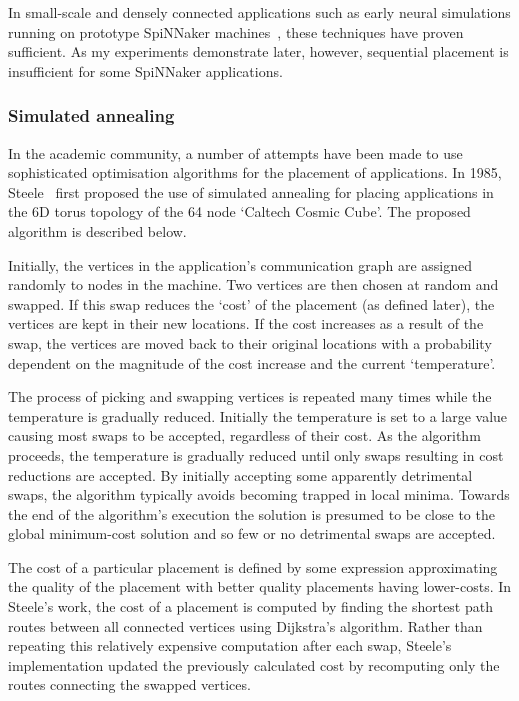 				In small-scale and densely connected applications such as early neural
				simulations running on prototype SpiNNaker machines~\cite{galluppi10},
				these techniques have proven sufficient.  As my experiments demonstrate
				later, however, sequential placement is insufficient for some SpiNNaker
				applications.
				
			\subsubsection{Simulated annealing}
				
				\label{sec:application-placement-summary}
				
				In the academic community, a number of attempts have been made to use
				sophisticated optimisation algorithms for the placement of
				applications. In 1985, Steele~\cite{steele85} first proposed the use of
				simulated annealing for placing applications in the 6D torus topology
				of the 64 node `Caltech Cosmic Cube'. The proposed algorithm is
				described below.
				
				Initially, the vertices in the application's communication graph are
				assigned randomly to nodes in the machine. Two vertices are then chosen
				at random and swapped.  If this swap reduces the `cost' of the
				placement (as defined later), the vertices are kept in their new
				locations. If the cost increases as a result of the swap, the vertices
				are moved back to their original locations with a probability dependent
				on the magnitude of the cost increase and the current `temperature'.
				
				The process of picking and swapping vertices is repeated many times
				while the temperature is gradually reduced. Initially the temperature
				is set to a large value causing most swaps to be accepted, regardless
				of their cost. As the algorithm proceeds, the temperature is gradually
				reduced until only swaps resulting in cost reductions are accepted. By
				initially accepting some apparently detrimental swaps, the algorithm
				typically avoids becoming trapped in local minima. Towards the end of
				the algorithm's execution the solution is presumed to be close to the
				global minimum-cost solution and so few or no detrimental swaps are
				accepted.
				
				The cost of a particular placement is defined by some expression
				approximating the quality of the placement with better quality
				placements having lower-costs. In Steele's work, the cost of a
				placement is computed by finding the shortest path routes between all
				connected vertices using Dijkstra's algorithm. Rather than repeating
				this relatively expensive computation after each swap, Steele's
				implementation updated the previously calculated cost by recomputing
				only the routes connecting the swapped vertices.
				
